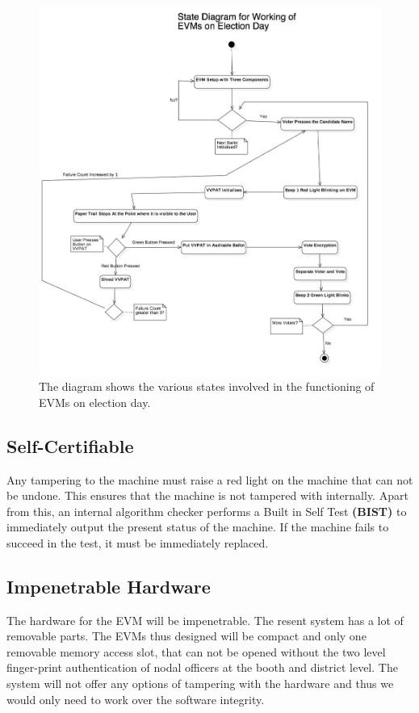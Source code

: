 \documentclass[a4paper,12pt]{extarticle}
\begin{document}
\begin{figure}
\centering
\includegraphics[width=1\textwidth]{EVM.jpg}
\caption{\label{fig:EVM}The diagram shows the various states  involved in the functioning of EVMs on election day.}
\end{figure}

\subsection{Self-Certifiable}
Any tampering to the machine must raise a red light on the machine that can not be undone. This ensures that the machine is not tampered with internally. Apart from this, an internal algorithm checker performs a Built in Self Test \textbf{(BIST)} to immediately output the present status of the machine. If the machine fails to succeed in the test, it must be immediately replaced.

\subsection{Impenetrable Hardware}
The hardware for the EVM will be impenetrable. The resent system has a lot of removable parts. The EVMs thus designed will  be compact and only one removable memory access slot, that can not be opened without the two level finger-print authentication of nodal officers at the booth and district level.
The system will not offer any options of tampering with the hardware and thus we would only need to work over the software integrity.
\end{document}

